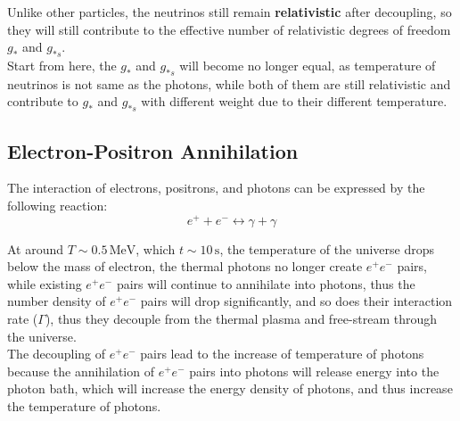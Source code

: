 \bigskip\noindent
\begin{importantnote}
    Unlike other particles, the neutrinos still remain \textbf{relativistic} after decoupling, so they will still contribute to the effective number of relativistic degrees of freedom $g_*$ and $g_{*s}$. \\

    Start from here, the $g_*$ and $g_{*s}$ will become no longer equal, as temperature of neutrinos is not same as the photons, while both of them are still relativistic and contribute to $g_*$ and $g_{*s}$ with different weight due to their different temperature. \\
\end{importantnote}

\clearpage
\subsection{Electron-Positron Annihilation}
\begin{theory}
    The interaction of electrons, positrons, and photons can be expressed by the following reaction:
    \[
        e^+ + e^- \leftrightarrow \gamma + \gamma
    \]
\end{theory}

At around $T \sim 0.5\,\mathrm{MeV}$, which $t \sim 10\,\mathrm{s}$, the temperature of the universe drops below the mass of electron, the thermal photons no longer create $e^+ e^-$ pairs, while existing $e^+ e^-$ pairs will continue to annihilate into photons, thus the number density of $e^+ e^-$ pairs will drop significantly, and so does their interaction rate ($\Gamma$), thus they decouple from the thermal plasma and free-stream through the universe. \\

The decoupling of $e^+ e^-$ pairs lead to the increase of temperature of photons because the annihilation of $e^+ e^-$ pairs into photons will release energy into the photon bath, which will increase the energy density of photons, and thus increase the temperature of photons. \\

